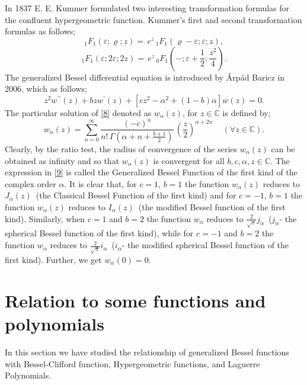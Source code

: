 \documentclass{amsart}
\theoremstyle{definition}
\theoremstyle{remark}
\numberwithin{equation}{section}
\begin{document}
In 1837 E. E. Kummer\cite{Kum} formulated two interesting transformation formulas for the confluent hypergeometric function. Kummer's first and second transformation formulas as follows;
\begin{equation}\label{6}
 _{1}F_{1} (\varepsilon; \varrho; z) =\, e^{z}\, _{1}F_{1} (\varrho-\varepsilon; \varepsilon; z),
\end{equation}
\begin{equation}\label{7}
 _{1}F_{1} (\varepsilon; 2\varepsilon; 2z) =\, e^{z}\, _{0}F_{1} \left(-; \varepsilon+\frac{1}{2}; \frac{z^{2}}{4}\right).
\end{equation}
  The generalized Bessel differential equation is introduced by \'{A}rp\'{a}d Baricz in 2006, which as follows\cite{Bar-1, Bar-3, Bar-4};
\begin{equation}\label{8}
  z^{2} w^{\prime \prime}(z) + b z w^{\prime}(z) + [cz^{2} - \alpha^{2} + (1-b)\alpha] w(z) = 0.
\end{equation}
The particular solution of \eqref{8} denoted as $w_{\alpha} (z)$, for $z \in \mathbb{C}$ is defined by;
\begin{equation}\label{9}
  {w_{\alpha} (z) = \sum_{n=0}^{\infty} \frac{(-c)^{n}}{n! \, \Gamma \left(\alpha+n+\frac{b+1}{2} \right)} \, \left(\frac{z}{2} \right)^{\alpha+2n}\,\,\,\,\,\,\, (\forall z \in \mathbb{C})}.
\end{equation}
Clearly, by the ratio test, the radius of convergence of the series $w_{\alpha} (z)$ can be obtained as infinity and so that $w_{\alpha} (z)$ is convergent for all $b, c, \alpha, z \in \mathbb{C}$.
The expression in \eqref{9} is called the Generalized Bessel Function of the first kind of the complex order $\alpha$.
 It is clear that, for $c=1$, $b=1$ the function $w_{\alpha} (z)$ reduces to $J_{\alpha} (z)$ \,(the Classical Bessel Function of the first kind) and for $c=-1$, $b=1$ the function $w_{\alpha} (z)$ reduces to $I_{\alpha} (z)$ \,(the modified Bessel function of the first kind).
Similarly, when $c=1$ and $b=2$ the function $w_{\alpha}$ reduces to $\frac{2}{\sqrt{\pi}} j_{\alpha}$\, ($j_{\alpha}$- the spherical Bessel function of the first kind), while for $c=-1$ and $b=2$ the function $w_{\alpha}$ reduces to $\frac{2}{\sqrt{\pi}} i_{\alpha}$\, ($i_{\alpha}$- the modified spherical Bessel function of the first kind). Further, we get $w_{\alpha} (0)=0$.

\section{Relation to some functions and polynomials}
In this section we have studied the relationship of generalized Bessel functions with Bessel-Clifford function, Hypergeometric functions, and Laguerre Polynomials.
\end{document}
